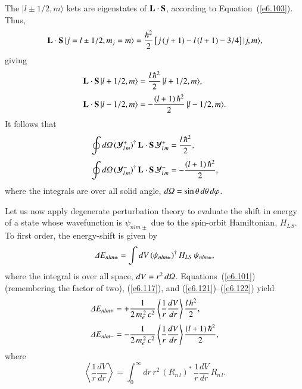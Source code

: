 The $|l\pm 1/2, m\rangle$ kets are eigenstates of ${\bf L}\cdot{\bf S}$,
according to Equation~(\ref{e6.103}).
Thus,
\begin{equation}
{\bf L} \cdot{\bf S}\, |j=l\pm 1/2,m_j= m\rangle = \frac{\hbar^2}{2}
\left[ j\,(j+1) - l\,(l+1) - 3/4\right]|j,m\rangle,
\end{equation}
giving
\begin{align}
{\bf L} \cdot{\bf S}\, |l+ 1/2, m\rangle&=
\frac{l \,\hbar^2}{2}\, |l+ 1/2, m\rangle,\\[0.5ex]
{\bf L} \cdot{\bf S}\, |l- 1/2, m\rangle&=
-\frac{(l+1)\, \hbar^2}{2}\, |l- 1/2, m\rangle.
\end{align}
It follows that
\begin{align}\label{e6.121}
\oint  d{\mit\Omega}\,({\cal Y}_{l\,m}^+)^\dagger \,{\bf L} \cdot{\bf S}\,
{\cal Y}_{l \,m}^+& = \frac{l \,\hbar^2}{2},\\[0.5ex]
\oint d{\mit\Omega}\,({\cal Y}_{l \,m}^-)^\dagger \,{\bf L} \cdot{\bf S}\,
{\cal Y}_{l\,m}^-& = -\frac{(l+1) \,\hbar^2}{2},\label{e6.122}
\end{align}
where the integrals are over all solid angle, $d{\mit\Omega} = \sin\theta\,d\theta\,d\varphi$. 

Let us now apply degenerate perturbation theory to evaluate the
 shift in energy  of a  state whose wavefunction is $\psi_{nlm\pm}$ 
due to the spin-orbit Hamiltonian, $H_{LS}$. To first order, the energy-shift is given by
\begin{equation}
{\mit\Delta} E_{nlm\pm} = \int dV\,(\psi_{nlm\pm})^\dagger\, H_{LS}\,\psi_{nlm\pm},
\end{equation}
where the integral is over all space, $dV = r^2\,d{\mit\Omega}$.  Equations~(\ref{e6.101}) (remembering the
factor of two), (\ref{e6.117}), and (\ref{e6.121})--(\ref{e6.122}) yield
\begin{align}\label{e6.124}
{\mit\Delta} E_{nlm+} &= +\frac{1}{2\,m_e^{\,2}\,c^2} \left\langle \frac{1}{r}\frac{dV}{dr}
\right\rangle \frac{l\,\hbar^2}{2},\\[0.5ex]
{\mit\Delta} E_{nlm-} &=- \frac{1}{2\,m_e^{\,2}\,c^2} \left\langle \frac{1}{r}\frac{dV}{dr}
\right\rangle \frac{(l+1)\,\hbar^2}{2},\label{e6.125}
\end{align}
where
\begin{equation}\label{e6.126}
 \left\langle \frac{1}{r}\frac{dV}{dr}
\right\rangle = \int_0^\infty dr\, r^2\,(R_{n\,l})^\ast \,\frac{1}{r}\frac{dV}{dr}\, R_{n\,l}.
\end{equation}

